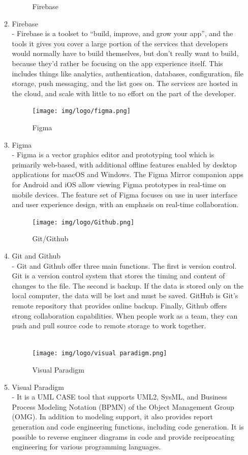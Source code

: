 \documentclass[conference]{IEEEtran}
\begin{document}
\begin{enumerate}
\begin{enumerate}
\begin{figure}[h!]
            \caption{Firebase}
        \end{figure}
        \item Firebase\\
        - Firebase is a toolset to “build, improve, and grow your app”, and the tools it gives you cover a large portion of the services that developers would normally have to build themselves, but don’t really want to build, because they’d rather be focusing on the app experience itself. This includes things like analytics, authentication, databases, configuration, file storage, push messaging, and the list goes on. The services are hosted in the cloud, and scale with little to no effort on the part of the developer.
         \begin{figure}[h!]
        \centerline{\texttt{[image: img/logo/figma.png]}}
        \caption{Figma}
        \end{figure}
        \item Figma\\
        - Figma is a vector graphics editor and prototyping tool which is primarily web-based, with additional offline features enabled by desktop applications for macOS and Windows. The Figma Mirror companion apps for Android and iOS allow viewing Figma prototypes in real-time on mobile devices. The feature set of Figma focuses on use in user interface and user experience design, with an emphasis on real-time collaboration.
        \begin{figure}[h!]
        \centerline{\texttt{[image: img/logo/Github.png]}}
        \caption{Git/Github}
        \end{figure}
        \item Git and Github\\
         - Git and Github offer three main functions. The first is version control. Git is a version control system that stores the timing and content of changes to the file. The second is backup. If the data is stored only on the local computer, the data will be lost and must be saved. GitHub is Git's remote repository that provides online backup. Finally, Github offers strong collaboration capabilities. When people work as a team, they can push and pull source code to remote storage to work together.\\\\
         \begin{figure}[h!]
        \centerline{\texttt{[image: img/logo/visual paradigm.png]}}
        \caption{Visual Paradigm}
        \end{figure}
        \item Visual Paradigm\\
        - It is a UML CASE tool that supports UML2, SysML, and Business Process Modeling Notation (BPMN) of the Object Management Group (OMG). In addition to modeling support, it also provides report generation and code engineering functions, including code generation. It is possible to reverse engineer diagrams in code and provide reciprocating engineering for various programming languages.
    \end{enumerate}
\end{enumerate}
\end{document}
